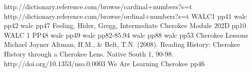 

\begin{thebibliography}{99}
 http://dictionary.reference.com/browse/cardinal+numbers?s=t
 http://dictionary.reference.com/browse/ordinal+numbers?s=t
 WALC1 pp41
 walc pp42
 walc pp47
 Feeling, Hider, Gregg, Intermediate Cherokee Module 202D pp10
 WALC 1 PP48
 walc pp49
 walc pp82-85,94
 walc pp88
 walc pp53
 Cherokee Lessons Michael Joyner
 Altman, H.M., \& Belt, T.N. (2008). Reading History: Cherokee History through a Cherokee Lens. Native South 1, 90-98. http://doi.org/10.1353/nso.0.0003
 We Are Learning Cherokee pp46
\end{thebibliography}
